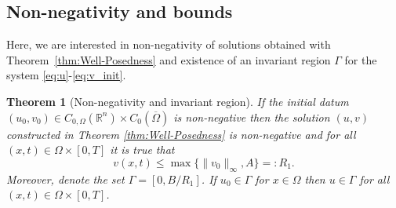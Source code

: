\documentclass[12pt, a4paper]{article}
\theoremstyle{break}
\newtheorem{thm}{Theorem}[section]
\theoremstyle{break}
\theoremstyle{break}
\theoremstyle{break}
\theoremstyle{break}
\theoremstyle{break}
\theoremstyle{break}
\begin{document}
\subsection{Non-negativity and bounds} 
Here, we are interested in non-negativity of solutions obtained with Theorem~\ref{thm:Well-Posedness} and existence of an invariant region $\Gamma$ for the system \eqref{eq:u}-\eqref{eq:v_init}.
\begin{thm}[Non-negativity and invariant region]
    \label{thm:Non-negativity}
     If the initial datum $(u_0, v_0) \in C_{0, \Omega}(\mathbb{R}^n) \times C_0(\overline{\Omega})$ is non-negative then the solution $(u, v)$ constructed in Theorem \ref{thm:Well-Posedness} is non-negative and for all $(x, t) \in \Omega \times [0, T]$ it is true that
     \begin{equation}
         v(x,t) \leq \max\{\|v_0\|_\infty, A\} =: R_1.
     \end{equation}
     Moreover, denote the set $\Gamma = [0, B/R_1]$. If $u_0 \in \Gamma$ for $x \in \Omega$ then $u \in \Gamma$ for all $(x, t) \in \Omega \times [0, T]$.
\end{thm}
\end{document}
